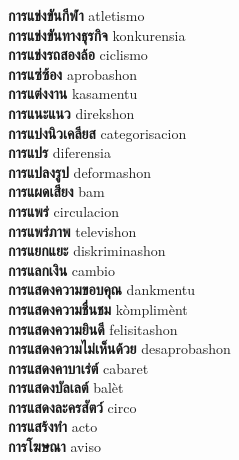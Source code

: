 \textbf{ การแข่งขันกีฬา  } atletismo \\
\textbf{ การแข่งขันทางธุรกิจ  } konkurensia \\
\textbf{ การแข่งรถสองล้อ  } ciclismo \\
\textbf{ การแซ่ซ้อง  } aprobashon \\
\textbf{ การแต่งงาน  } kasamentu \\
\textbf{ การแนะแนว  } direkshon \\
\textbf{ การแบ่งนิวเคลียส  } categorisacion \\
\textbf{ การแปร  } diferensia \\
\textbf{ การแปลงรูป  } deformashon \\
\textbf{ การแผดเสียง  } bam \\
\textbf{ การแพร่  } circulacion \\
\textbf{ การแพร่ภาพ  } televishon \\
\textbf{ การแยกแยะ  } diskriminashon \\
\textbf{ การแลกเงิน  } cambio \\
\textbf{ การแสดงความขอบคุณ  } dankmentu \\
\textbf{ การแสดงความชื่นชม  } kòmplimènt \\
\textbf{ การแสดงความยินดี  } felisitashon \\
\textbf{ การแสดงความไม่เห็นด้วย  } desaprobashon \\
\textbf{ การแสดงคาบาเร่ต์  } cabaret \\
\textbf{ การแสดงบัลเลต์  } balèt \\
\textbf{ การแสดงละครสัตว์  } circo \\
\textbf{ การแสร้งทำ  } acto \\
\textbf{ การโฆษณา  } aviso \\
